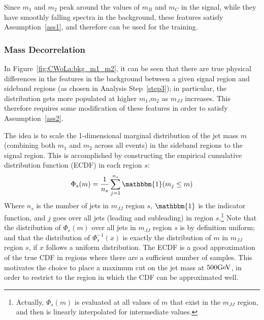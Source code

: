 Since $m_1$ and $m_2$ peak around the values of $m_B$ and $m_C$ in the signal, while they have smoothly falling spectra in the background, these features satisfy Assumption~\ref{ass1}, and therefore can be used for the training.

\subsubsection{Mass Decorrelation}
\label{sec:CWoLa:decorrelation}
In Figure~\ref{fig:CWoLa:bkg_m1_m2}, it can be seen that there are true physical differences in the features in the background between a given signal region and sideband regions (as chosen in Analysis Step~\ref{step3}); in particular, the distribution gets more populated at higher $m_1$,$m_2$ as $m_{JJ}$ increases.
This therefore requires some modification of these features in order to satisfy Assumption~\ref{ass2}.

The idea is to scale the 1-dimensional marginal distribution of the jet mass $m$ (combining both $m_1$ and $m_2$ across all events) in the sideband regions to the signal region.
This is accomplished by constructing the empirical cumulative distribution function (ECDF) in each region $s$:
\begin{align}
  \Phi_s(m) = \frac{1}{n_s} \sum_{j=1}^{n_s} \mathbbm{1}(m_j\le m)
\end{align}
Where $n_s$ is the number of jets in $m_{JJ}$ region $s$, $\mathbbm{1}$ is the indicator function, and $j$ goes over all jets (leading and subleading) in region $s$.\footnote{Actually, $\Phi_s(m)$ is evaluated at all values of $m$ that exist in the $m_{JJ}$ region, and then is linearly interpolated for intermediate values.}
Note that the distribution of $\Phi_s(m)$ over all jets in $m_{JJ}$ region $s$ is by definition uniform; and that the distribution of $\Phi^{-1}_s(x)$ is exactly the distribution of $m$ in $m_{JJ}$ region $s$, if $x$ follows a uniform distribution.
The ECDF is a good approximation of the true CDF in regions where there are a sufficient number of samples.
This motivates the choice to place a maximum cut on the jet mass at $500 \mathrm{GeV}$, in order to restrict to the region in which the CDF can be approximated well.

